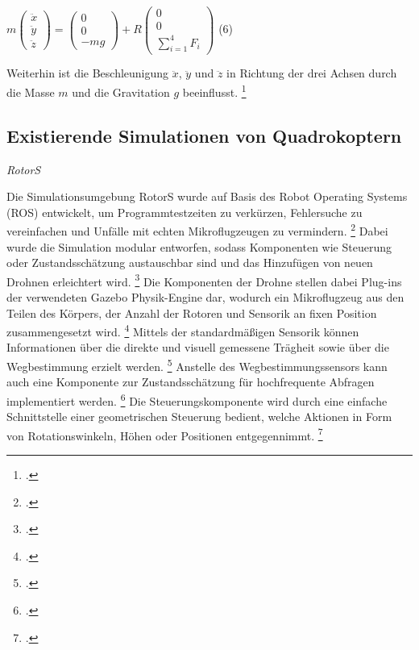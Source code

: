 \begin{description}
    \item \begin{center} $m\begin{pmatrix} \ddot x \\ \ddot y \\ \ddot z \end{pmatrix} = \begin{pmatrix}0 \\ 0 \\ -mg\end{pmatrix} + R\begin{pmatrix} 0 \\ 0 \\ \sum_{i=1}^{4} F_{i} \end{pmatrix}$ (6)\end{center}
\end{description}
Weiterhin ist die Beschleunigung $\ddot x$, $\ddot y$ und $\ddot z$ in Richtung der drei Achsen durch die Masse $m$ und die Gravitation $g$ beeinflusst. \footcite[Vgl.][S. 3]{Deshpande.2020}


\subsection{Existierende Simulationen von Quadrokoptern}

\textit{RotorS}

Die Simulationsumgebung RotorS wurde auf Basis des Robot Operating Systems (ROS) entwickelt, um Programmtestzeiten zu verkürzen, Fehlersuche zu vereinfachen und Unfälle mit echten Mikroflugzeugen zu vermindern. \footcite[Vgl.][S. 596]{Furrer.2016}
Dabei wurde die Simulation modular entworfen, sodass Komponenten wie Steuerung oder Zustandsschätzung austauschbar sind und das Hinzufügen von neuen Drohnen erleichtert wird. \footcite[Vgl.][S. 595]{Furrer.2016}
Die Komponenten der Drohne stellen dabei Plug-ins der verwendeten Gazebo Physik-Engine dar, wodurch ein Mikroflugzeug aus den Teilen des Körpers, der Anzahl der Rotoren und Sensorik an fixen Position zusammengesetzt wird. \footcite[Vgl.][S. 597]{Furrer.2016}
Mittels der standardmäßigen Sensorik können Informationen über die direkte und visuell gemessene Trägheit sowie über die Wegbestimmung erzielt werden. \footcite[Vgl.][S. 597]{Furrer.2016}
Anstelle des Wegbestimmungssensors kann auch eine Komponente zur Zustandsschätzung für hochfrequente Abfragen implementiert werden. \footcite[Vgl.][S. 598]{Furrer.2016}
Die Steuerungskomponente wird durch eine einfache Schnittstelle einer geometrischen Steuerung bedient, welche Aktionen in Form von Rotationswinkeln, Höhen oder Positionen entgegennimmt. \footcite[Vgl.][S. 598]{Furrer.2016}

